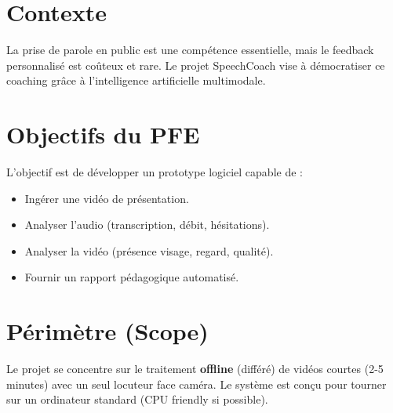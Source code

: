 \section{Contexte}
La prise de parole en public est une compétence essentielle, mais le feedback personnalisé est coûteux et rare. Le projet SpeechCoach vise à démocratiser ce coaching grâce à l'intelligence artificielle multimodale.

\section{Objectifs du PFE}
L'objectif est de développer un prototype logiciel capable de :
\begin{itemize}
    \item Ingérer une vidéo de présentation.
    \item Analyser l'audio (transcription, débit, hésitations).
    \item Analyser la vidéo (présence visage, regard, qualité).
    \item Fournir un rapport pédagogique automatisé.
\end{itemize}

\section{Périmètre (Scope)}
Le projet se concentre sur le traitement \textbf{offline} (différé) de vidéos courtes (2-5 minutes) avec un seul locuteur face caméra. Le système est conçu pour tourner sur un ordinateur standard (CPU friendly si possible).

